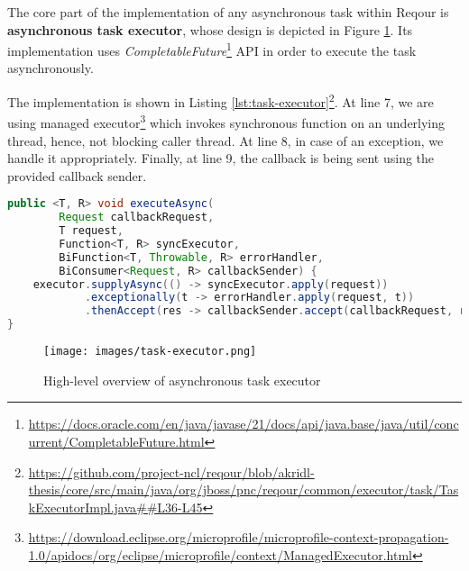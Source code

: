 \documentclass[../main.tex]{subfiles}
\begin{document}
The core part of the implementation of any asynchronous task within Reqour is \textbf{asynchronous task executor}, whose design is depicted in Figure \ref{fig:task-executor}. Its implementation uses \textit{CompletableFuture}\footnote{\url{https://docs.oracle.com/en/java/javase/21/docs/api/java.base/java/util/concurrent/CompletableFuture.html}} API in order to execute the task asynchronously.

The implementation is shown in Listing \ref{lst:task-executor}\footnote{\url{https://github.com/project-ncl/reqour/blob/akridl-thesis/core/src/main/java/org/jboss/pnc/reqour/common/executor/task/TaskExecutorImpl.java##L36-L45}}. At line 7, we are using managed executor\footnote{\url{https://download.eclipse.org/microprofile/microprofile-context-propagation-1.0/apidocs/org/eclipse/microprofile/context/ManagedExecutor.html}} which invokes synchronous function on an underlying thread, hence, not blocking caller thread. At line 8, in case of an exception, we handle it appropriately. Finally, at line 9, the callback is being sent using the provided callback sender.

\begin{lstlisting}[language=Java, caption=Asynchronous task executor, label={lst:task-executor}]
public <T, R> void executeAsync(
        Request callbackRequest,
        T request,
        Function<T, R> syncExecutor,
        BiFunction<T, Throwable, R> errorHandler,
        BiConsumer<Request, R> callbackSender) {
    executor.supplyAsync(() -> syncExecutor.apply(request))
            .exceptionally(t -> errorHandler.apply(request, t))
            .thenAccept(res -> callbackSender.accept(callbackRequest, res));
}
\end{lstlisting}

\begin{figure}
  \begin{center}
    \texttt{[image: images/task-executor.png]}
  \end{center}
  \caption{High-level overview of asynchronous task executor}
  \label{fig:task-executor}
\end{figure}
\end{document}
